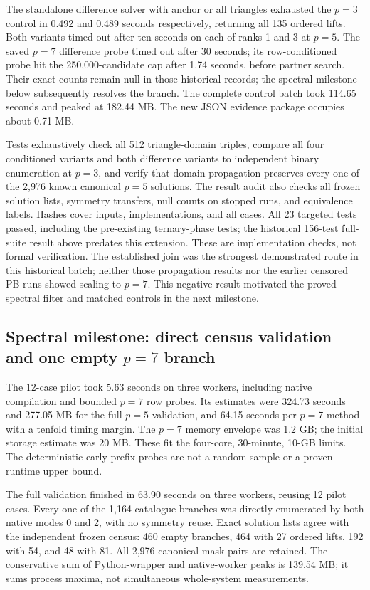 \documentclass[11pt]{article}
\begin{document}
The standalone difference solver with anchor or all triangles exhausted the
$p=3$ control in 0.492 and 0.489 seconds respectively, returning all 135
ordered lifts. Both variants timed out after ten seconds on each of ranks
1 and 3 at $p=5$. The saved $p=7$ difference probe timed out after 30 seconds;
its row-conditioned probe hit the 250,000-candidate cap after 1.74 seconds,
before partner search. Their exact counts remain null in those historical
records; the spectral milestone below subsequently resolves the branch.
The complete control batch took 114.65 seconds and peaked at
182.44 MB. The new JSON evidence package occupies about 0.71 MB.

Tests exhaustively check all 512 triangle-domain triples, compare all four
conditioned variants and both difference variants to independent binary
enumeration at $p=3$, and verify that domain propagation preserves every one
of the 2,976 known canonical $p=5$ solutions. The result audit also checks
all frozen solution lists, symmetry transfers, null counts on stopped runs,
and equivalence labels. Hashes cover inputs, implementations, and all cases.
All 23 targeted tests passed, including the pre-existing ternary-phase tests;
the historical 156-test full-suite result above predates this extension.
These are implementation checks, not formal verification. The established
join was the strongest demonstrated route in this historical batch;
neither those propagation results nor the earlier censored PB runs showed
scaling to $p=7$. This negative result motivated the proved spectral filter
and matched controls in the next milestone.

\subsection{Spectral milestone: direct census validation and one empty $p=7$ branch}
The 12-case pilot took 5.63 seconds on three workers,
including native compilation and bounded $p=7$ row probes. Its estimates
were 324.73 seconds and
277.05 MB for the full
$p=5$ validation, and 64.15
seconds per $p=7$ method with a tenfold timing margin. The $p=7$ memory
envelope was 1.2 GB; the initial storage estimate was 20 MB. These fit the
four-core, 30-minute, 10-GB limits. The deterministic early-prefix probes
are not a random sample or a proven runtime upper bound.

The full validation finished in 63.90 seconds on three
workers, reusing 12 pilot cases. Every one of the 1,164 catalogue branches
was directly enumerated by both native modes 0 and 2, with no symmetry reuse.
Exact solution lists agree with the independent frozen census: 460 empty
branches, 464 with 27 ordered lifts, 192 with 54, and 48 with 81. All 2,976
canonical mask pairs are retained. The conservative sum of Python-wrapper and
native-worker peaks is 139.54
MB; it sums process maxima, not simultaneous whole-system measurements.
\end{document}
